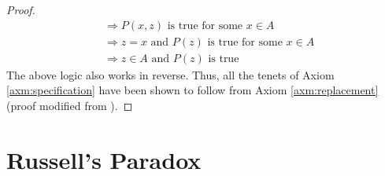 \documentclass[../main.tex]{subfiles}
\begin{document}
\begin{enumerate}[ref={\thesection.\arabic*}]
\begin{proof}
\begin{align*}
            &\Longrightarrow P(x,z)\text{ is true for some }x\in A\\
            &\Longrightarrow z=x\text{ and }P(z)\text{ is true for some }x\in A\\
            &\Longrightarrow z\in A\text{ and }P(z)\text{ is true}
        \end{align*}
        The above logic also works in reverse. Thus, all the tenets of Axiom \ref{axm:specification} have been shown to follow from Axiom \ref{axm:replacement} (proof modified from \cite{bib:ReplacementToSpecification}).
    \end{proof}
\end{enumerate}



\section{Russell's Paradox}
\end{document}
